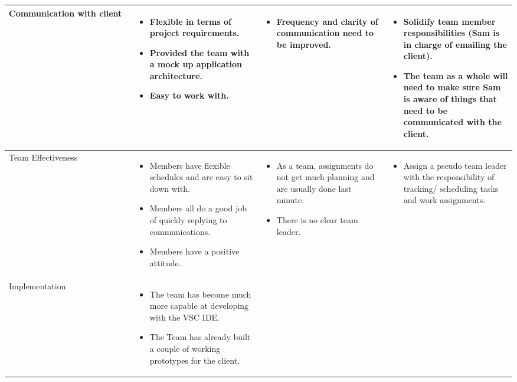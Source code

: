\documentclass[letterpaper,10pt,titlepage,draftclsnofoot,onecolumn,onesided] {IEEEtran}
\begin{document}
\begin{center}
\begin{singlespace}
\begin{tabular}{ |  p{0.25\linewidth}  |  p{0.25\linewidth}  | p{0.25\linewidth} | p{0.25\linewidth} |}
			Communication with client 
		& 
			\begin{itemize}
				\item Flexible in terms of project requirements.
				\item Provided the team with a mock up application architecture.
				\item Easy to work with.
			\end{itemize}
		& 
			\begin{itemize}
				\item Frequency and clarity of communication need to be improved.
			\end{itemize}
		&
			\begin{itemize}
				\item Solidify team member responsibilities (Sam is in charge of emailing the client).
				\item The team as a whole will need to make sure Sam is aware of things that need to be communicated with the client.
			\end{itemize} 
		\\ \hline
			Team Effectiveness 
		& 
			\begin{itemize}
				\item Members have flexible schedules and are easy to sit down with.
				\item Members all do a good job of quickly replying to communications.
				\item Members have a positive attitude.
			\end{itemize}
		& 
			\begin{itemize}
				\item As a team, assignments do not get much planning and are usually done last minute.
				\item There is no clear team leader.
			\end{itemize}
		&
			\begin{itemize}
				\item Assign a pseudo team leader with the responsibility of tracking/ scheduling tasks and work assignments.
			\end{itemize} 
		\\ \hline
			Implementation 
		& 
			\begin{itemize}
				\item The team has become much more capable at developing with the VSC IDE.
				\item The Team has already built a couple of working prototypes for the client.
			\end{itemize}

\end{tabular}
\end{singlespace}
\end{center}
\end{document}
